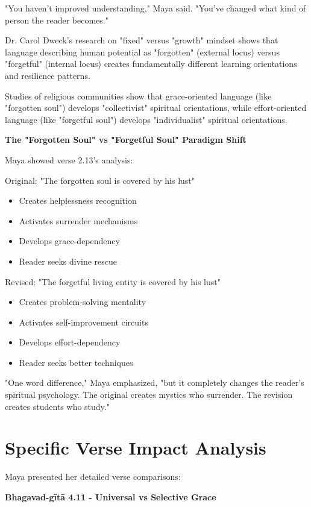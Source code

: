 \documentclass[11pt,twoside]{book}
\begin{document}
"You haven't improved understanding," Maya said. "You've changed what kind of person the reader becomes."

Dr. Carol Dweck's research on "fixed" versus "growth" mindset shows that language describing human potential as "forgotten" (external locus) versus "forgetful" (internal locus) creates fundamentally different learning orientations and resilience patterns.

Studies of religious communities show that grace-oriented language (like "forgotten soul") develops "collectivist" spiritual orientations, while effort-oriented language (like "forgetful soul") develops "individualist" spiritual orientations.

\textbf{\textbf{The "Forgotten Soul" vs "Forgetful Soul" Paradigm Shift}}

Maya showed verse 2.13's analysis:

Original: "The forgotten soul is covered by his lust"
\begin{itemize}
\item Creates helplessness recognition
\item Activates surrender mechanisms
\item Develops grace-dependency
\item Reader seeks divine rescue
\end{itemize}

Revised: "The forgetful living entity is covered by his lust"
\begin{itemize}
\item Creates problem-solving mentality
\item Activates self-improvement circuits
\item Develops effort-dependency
\item Reader seeks better techniques
\end{itemize}

"One word difference," Maya emphasized, "but it completely changes the reader's spiritual psychology. The original creates mystics who surrender. The revision creates students who study."
\section*{Specific Verse Impact Analysis}
\label{sec:orgcaa8f67}

Maya presented her detailed verse comparisons:

\textbf{\textbf{Bhagavad-gītā 4.11 - Universal vs Selective Grace}}
\end{document}
